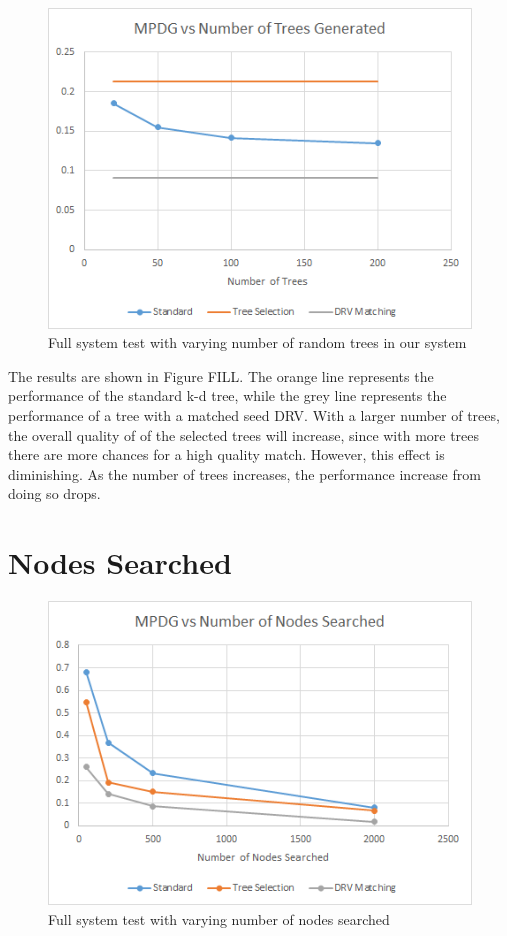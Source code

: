 \begin{figure}[h]
\begin{center}
\includegraphics[width=.85\textwidth]{Figures/ntreesgen}
\end{center}
\caption{Full system test with varying number of random trees in our system}
\label{fig:ntreesgen}
\end{figure}

The results are shown in Figure FILL.  The orange line represents the performance of the standard k-d tree, while the grey line represents the performance of a tree with a matched seed DRV.  With a larger number of trees, the overall quality of of the selected trees will increase, since with more trees there are more chances for a high quality match.  However, this effect is diminishing.  As the number of trees increases, the performance increase from doing so drops.

\section{Nodes Searched}

\begin{figure}[h]
\begin{center}
\includegraphics[width=.85\textwidth]{Figures/nsearch}
\end{center}
\caption{Full system test with varying number of nodes searched}
\label{fig:nsearch}
\end{figure}

